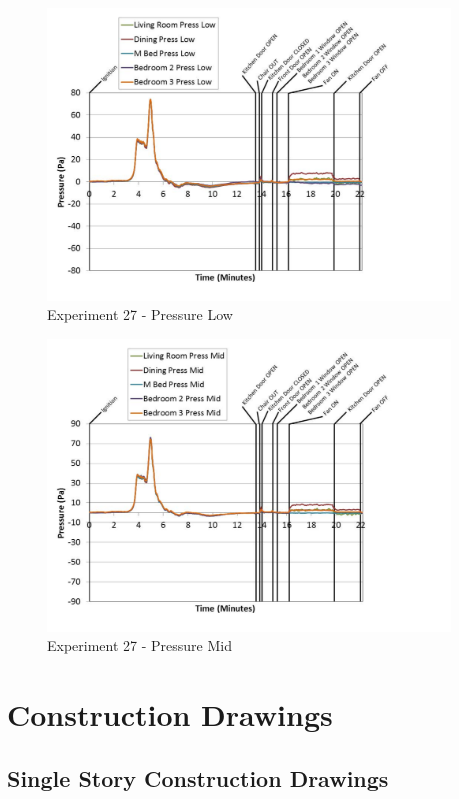 \documentclass{article}
\begin{document}
\begin{appendices}
	\clearpage

	\begin{figure}[h!]
		\centering
		\includegraphics[height=3.05in]{0_Images/Results_Charts/Exp_27_Charts/PressureLow.pdf}
		\caption{Experiment 27 - Pressure Low}
	\end{figure}
 

	\begin{figure}[h!]
		\centering
		\includegraphics[height=3.05in]{0_Images/Results_Charts/Exp_27_Charts/PressureMid.pdf}
		\caption{Experiment 27 - Pressure Mid}
	\end{figure}
 
	\clearpage

		\clearpage

\section{Construction Drawings} \label{App:ConstructionDrawings}

\clearpage

\subsection{Single Story Construction Drawings}


\end{appendices}
\end{document}
